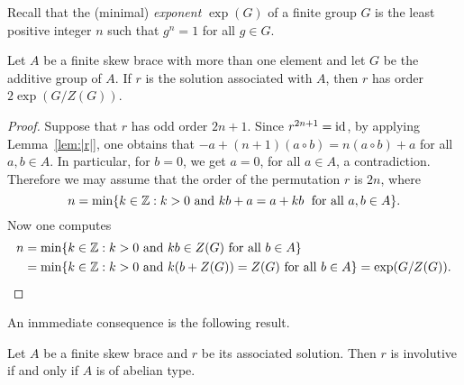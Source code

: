 %

Recall that the (minimal) \emph{exponent} $\exp(G)$ of a 
finite group $G$ is the least positive integer $n$ such that 
$g^n=1$ for all $g\in G$. 

\begin{theorem} 
\label{thm:|r|} 
  Let $A$ be a finite skew brace with more than one
  element and let $G$ be the additive group of $A$. 
  If $r$ is the solution associated with $A$, 
  then $r$ has order $2\exp(G/Z(G))$.
\end{theorem}

\begin{proof} 
  Suppose that $r$ has odd order $2n+1$. Since $r^{2n+1}=\operatorname{id}$, by applying
  Lemma~\ref{lem:|r|}, one obtains that $-a+(n+1)(a\circ b)=n(a\circ b)+a$
  for all $a,b\in A$. In particular, for $b=0$, we get $a=0$, for all $a\in A$, a contradiction. 
  Therefore we may assume that the order of the permutation $r$ is
  $2n$, where 
  \[
  n=\min\{k\in\mathbb{Z}: k>0\text{ and }kb+a=a+kb\;\text{ for all }a,b\in A\}.
  \]
  Now one computes
  \begin{align*} 
  n&=\min\{k\in\mathbb{Z}: k>0\text{ and }kb\in Z(G)\text{ for all }b\in A\}\\ 
  &=\min\{k\in\mathbb{Z}: k>0\text{ and }k(b+Z(G)) = Z(G)\text{ for all }b\in A\} =\exp(G/Z(G)).\qedhere
  \end{align*}
\end{proof}

An inmmediate consequence is the following result.

\begin{corollary}
    Let $A$ be a finite skew brace and $r$ be its associated solution. Then 
    $r$ is involutive if and only if $A$ is of abelian type.
    \end{corollary}


